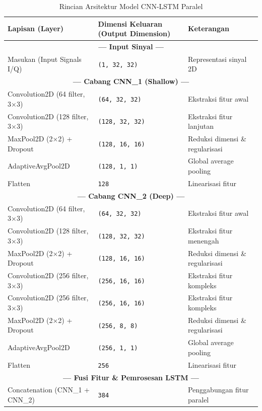 \documentclass{article}
\begin{document}
\begin{table}[h]
\centering
\caption{Rincian Arsitektur Model CNN-LSTM Paralel}
\label{tab:arsitektur_model_paralel}
\footnotesize
\begin{tabular}{|l|l|l|}
\hline
\textbf{Lapisan (Layer)} & \textbf{Dimensi Keluaran (Output Dimension)} & \textbf{Keterangan} \\
\hline
\multicolumn{3}{|c|}{\textbf{--- Input Sinyal ---}} \\
\hline
Masukan (Input Signals I/Q) & \texttt{(1, 32, 32)} & Representasi sinyal 2D \\
\hline
\multicolumn{3}{|c|}{\textbf{--- Cabang CNN\_1 (Shallow) ---}} \\
\hline
Convolution2D (64 filter, 3×3) & \texttt{(64, 32, 32)} & Ekstraksi fitur awal \\
Convolution2D (128 filter, 3×3) & \texttt{(128, 32, 32)} & Ekstraksi fitur lanjutan \\
MaxPool2D (2×2) + Dropout & \texttt{(128, 16, 16)} & Reduksi dimensi \& regularisasi \\
AdaptiveAvgPool2D & \texttt{(128, 1, 1)} & Global average pooling \\
Flatten & \texttt{128} & Linearisasi fitur \\
\hline
\multicolumn{3}{|c|}{\textbf{--- Cabang CNN\_2 (Deep) ---}} \\
\hline
Convolution2D (64 filter, 3×3) & \texttt{(64, 32, 32)} & Ekstraksi fitur awal \\
Convolution2D (128 filter, 3×3) & \texttt{(128, 32, 32)} & Ekstraksi fitur menengah \\
MaxPool2D (2×2) + Dropout & \texttt{(128, 16, 16)} & Reduksi dimensi \& regularisasi \\
Convolution2D (256 filter, 3×3) & \texttt{(256, 16, 16)} & Ekstraksi fitur kompleks \\
Convolution2D (256 filter, 3×3) & \texttt{(256, 16, 16)} & Ekstraksi fitur kompleks \\
MaxPool2D (2×2) + Dropout & \texttt{(256, 8, 8)} & Reduksi dimensi \& regularisasi \\
AdaptiveAvgPool2D & \texttt{(256, 1, 1)} & Global average pooling \\
Flatten & \texttt{256} & Linearisasi fitur \\
\hline
\multicolumn{3}{|c|}{\textbf{--- Fusi Fitur \& Pemrosesan LSTM ---}} \\
\hline
Concatenation (CNN\_1 + CNN\_2) & \texttt{384} & Penggabungan fitur paralel \\

\end{tabular}
\end{table}
\end{document}
